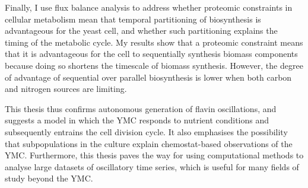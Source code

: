 {  Finally, I use flux balance analysis to address whether proteomic constraints in cellular me\-tab\-o\-lism mean that temporal partitioning of biosynthesis is advantageous for the yeast cell, and whether such partitioning explains the timing of the metabolic cycle.
  My results show that a proteomic constraint means that it is advantageous for the cell to sequentially synthesis biomass components because doing so shortens the timescale of biomass synthesis.
  However, the degree of advantage of sequential over parallel biosynthesis is lower when both carbon and nitrogen sources are limiting.

  This thesis thus confirms autonomous generation of flavin oscillations, and suggests a model in which the YMC responds to nutrient conditions and subsequently entrains the cell division cycle.
  It also emphasises the possibility that subpopulations in the culture explain chemostat-based observations of the YMC.
  Furthermore, this thesis paves the way for using computational methods to analyse large datasets of oscillatory time series, which is useful for many fields of study beyond the YMC.
}


